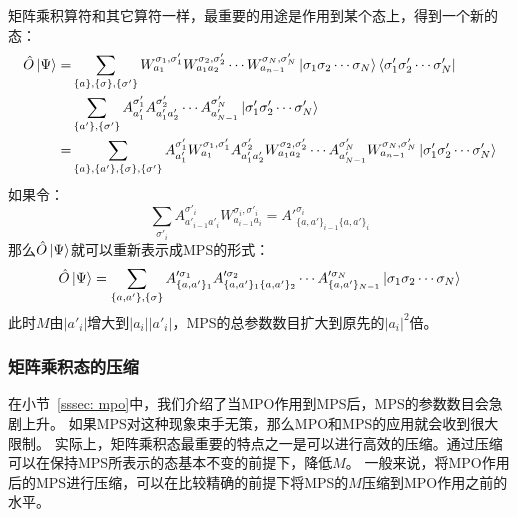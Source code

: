 \documentclass{article}
\begin{document}
矩阵乘积算符和其它算符一样，最重要的用途是作用到某个态上，得到一个新的态：
\begin{equation}
\begin{aligned}
    \hat{O} \ket{\Psi} = 
       & \sum_{\{a\},\{\sigma\},\{\sigma'\}}
         W^{\sigma_1, \sigma'_1}_{a_1} W^{\sigma_2, \sigma'_2}_{a_1a_2} \cdots
                        W^{\sigma_N, \sigma'_N}_{a_{n-1}} 
                        \ket{\sigma_1\sigma_2\cdots\sigma_N}
                        \bra{\sigma'_1\sigma'_2 \cdots \sigma'_N} \\
        & \sum_{\{a'\},\{\sigma'\}}
     A^{\sigma'_1}_{a'_1} A^{\sigma'_2}_{a'_1a'_2} \cdots
           A^{\sigma'_N}_{a'_{N-1}}  \ket{ \sigma'_1\sigma'_2\cdots\sigma'_N } \\
      = & \sum_{\{a\},\{a'\}, \{\sigma\},\{\sigma'\}}
           A^{\sigma'_1}_{a'_1} W^{\sigma_1, \sigma'_1}_{a_1} 
           A^{\sigma'_2}_{a'_1a'_2} W^{\sigma_2, \sigma'_2}_{a_1a_2} \cdots
           A^{\sigma'_N}_{a'_{N-1}} W^{\sigma_N, \sigma'_N}_{a_{n-1}}
           \ket{ \sigma'_1\sigma'_2\cdots\sigma'_N } \\
\end{aligned}
\end{equation}
如果令：
\begin{equation}
    \sum_{\sigma'_i} A^{\sigma'_i}_{a'_{i-1}a'_{i}} W^{\sigma_i, \sigma'_i}_{a_{i-1}a_{i}}
    = A'^{\sigma_i}_{\{a, a'\}_{i-1}\{a, a'\}_{i}}
\end{equation}
那么$\hat{O} \ket{\Psi}$就可以重新表示成MPS的形式：
\begin{equation}
    \hat{O} \ket{\Psi} = \sum_{\{a, a'\},\{\sigma\}}
           A'^{\sigma_1}_{\{a, a'\}_1} A'^{\sigma_2}_{\{a, a'\}_1\{a, a'\}_2} \cdots
           A'^{\sigma_N}_{\{a, a'\}_{N-1}}  \ket{ \sigma_1\sigma_2\cdots\sigma_N } 
\end{equation}
此时$M$由$|a'_i|$增大到$|a_i|| a'_i|$，MPS的总参数数目扩大到原先的$|a_i|^2$倍。


\subsubsection{矩阵乘积态的压缩}
\label{sssec: compress}
在小节~\ref{sssec: mpo}中，我们介绍了当MPO作用到MPS后，MPS的参数数目会急剧上升。
如果MPS对这种现象束手无策，那么MPO和MPS的应用就会收到很大限制。
实际上，矩阵乘积态最重要的特点之一是可以进行高效的压缩。通过压缩可以在保持MPS所表示的态基本不变的前提下，降低$M$。
一般来说，将MPO作用后的MPS进行压缩，可以在比较精确的前提下将MPS的$M$压缩到MPO作用之前的水平。
\end{document}
